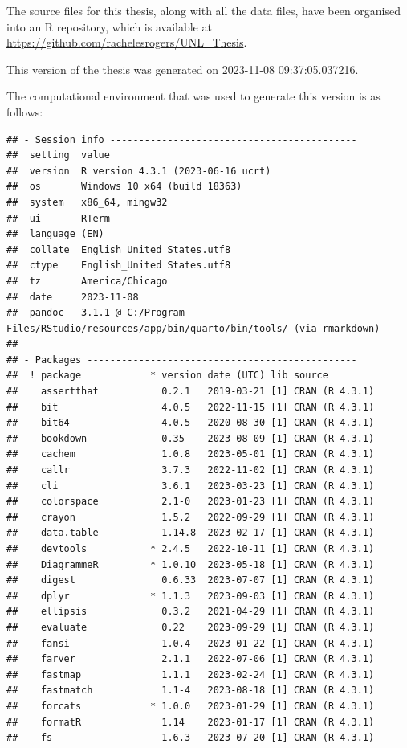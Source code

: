 \documentclass[print]{nuthesis}
\begin{document}
The source files for this thesis, along with all the data files, have been organised into an R repository, which is available at \url{https://github.com/rachelesrogers/UNL_Thesis}.

This version of the thesis was generated on 2023-11-08 09:37:05.037216.

The computational environment that was used to generate this version is as follows:

\begin{verbatim}
## - Session info -------------------------------------------
##  setting  value
##  version  R version 4.3.1 (2023-06-16 ucrt)
##  os       Windows 10 x64 (build 18363)
##  system   x86_64, mingw32
##  ui       RTerm
##  language (EN)
##  collate  English_United States.utf8
##  ctype    English_United States.utf8
##  tz       America/Chicago
##  date     2023-11-08
##  pandoc   3.1.1 @ C:/Program Files/RStudio/resources/app/bin/quarto/bin/tools/ (via rmarkdown)
## 
## - Packages -----------------------------------------------
##  ! package            * version date (UTC) lib source
##    assertthat           0.2.1   2019-03-21 [1] CRAN (R 4.3.1)
##    bit                  4.0.5   2022-11-15 [1] CRAN (R 4.3.1)
##    bit64                4.0.5   2020-08-30 [1] CRAN (R 4.3.1)
##    bookdown             0.35    2023-08-09 [1] CRAN (R 4.3.1)
##    cachem               1.0.8   2023-05-01 [1] CRAN (R 4.3.1)
##    callr                3.7.3   2022-11-02 [1] CRAN (R 4.3.1)
##    cli                  3.6.1   2023-03-23 [1] CRAN (R 4.3.1)
##    colorspace           2.1-0   2023-01-23 [1] CRAN (R 4.3.1)
##    crayon               1.5.2   2022-09-29 [1] CRAN (R 4.3.1)
##    data.table           1.14.8  2023-02-17 [1] CRAN (R 4.3.1)
##    devtools           * 2.4.5   2022-10-11 [1] CRAN (R 4.3.1)
##    DiagrammeR         * 1.0.10  2023-05-18 [1] CRAN (R 4.3.1)
##    digest               0.6.33  2023-07-07 [1] CRAN (R 4.3.1)
##    dplyr              * 1.1.3   2023-09-03 [1] CRAN (R 4.3.1)
##    ellipsis             0.3.2   2021-04-29 [1] CRAN (R 4.3.1)
##    evaluate             0.22    2023-09-29 [1] CRAN (R 4.3.1)
##    fansi                1.0.4   2023-01-22 [1] CRAN (R 4.3.1)
##    farver               2.1.1   2022-07-06 [1] CRAN (R 4.3.1)
##    fastmap              1.1.1   2023-02-24 [1] CRAN (R 4.3.1)
##    fastmatch            1.1-4   2023-08-18 [1] CRAN (R 4.3.1)
##    forcats            * 1.0.0   2023-01-29 [1] CRAN (R 4.3.1)
##    formatR              1.14    2023-01-17 [1] CRAN (R 4.3.1)
##    fs                   1.6.3   2023-07-20 [1] CRAN (R 4.3.1)

\end{verbatim}
\end{document}
